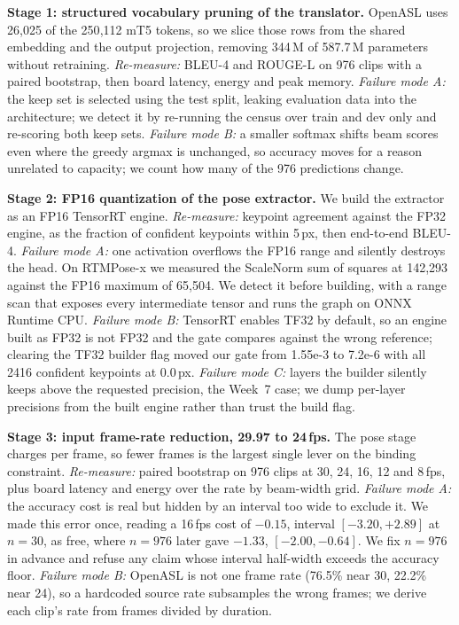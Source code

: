 \documentclass[conference]{IEEEtran}
\begin{document}
\textbf{Stage 1: structured vocabulary pruning of the translator.} OpenASL uses 26{,}025
of the 250{,}112 mT5 tokens, so we slice those rows from the shared embedding and the
output projection, removing 344\,M of 587.7\,M parameters without retraining.
\emph{Re-measure:} BLEU-4 and ROUGE-L on 976 clips with a paired bootstrap, then board
latency, energy and peak memory. \emph{Failure mode A:} the keep set is selected using
the test split, leaking evaluation data into the architecture; we detect it by
re-running the census over train and dev only and re-scoring both keep sets.
\emph{Failure mode B:} a smaller softmax shifts beam scores even where the greedy
argmax is unchanged, so accuracy moves for a reason unrelated to capacity; we count
how many of the 976 predictions change.

\textbf{Stage 2: FP16 quantization of the pose extractor.} We build the extractor as an
FP16 TensorRT engine. \emph{Re-measure:} keypoint agreement against the FP32 engine,
as the fraction of confident keypoints within 5\,px, then end-to-end BLEU-4.
\emph{Failure mode A:} one activation overflows the FP16 range and silently destroys
the head. On RTMPose-x we measured the
ScaleNorm sum of squares at 142{,}293 against the FP16 maximum of 65{,}504. We detect
it before building, with a range scan that exposes every intermediate tensor and runs
the graph on ONNX Runtime CPU. \emph{Failure mode B:} TensorRT enables TF32 by
default, so an engine built as FP32 is not FP32 and the gate compares against the
wrong reference; clearing the TF32 builder flag moved our gate from 1.55e-3 to 7.2e-6
with all 2416 confident keypoints at 0.0\,px. \emph{Failure mode C:} layers the
builder silently keeps above the requested precision, the Week~7 case; we dump
per-layer precisions from the built engine rather than trust the build flag.

\textbf{Stage 3: input frame-rate reduction, 29.97 to 24\,fps.} The pose stage charges
per frame, so fewer frames is the largest single lever on the binding constraint.
\emph{Re-measure:} paired bootstrap on 976 clips at 30, 24, 16, 12 and 8\,fps, plus
board latency and energy over the rate by beam-width grid. \emph{Failure mode A:} the
accuracy cost is real but hidden by an interval too wide to exclude it. We made this error once, reading a 16\,fps cost of $-0.15$,
interval $[-3.20, +2.89]$ at $n{=}30$, as free, where $n{=}976$ later gave $-1.33$,
$[-2.00, -0.64]$. We fix $n{=}976$ in advance and refuse any claim whose interval
half-width exceeds the accuracy floor. \emph{Failure mode B:} OpenASL is not one frame rate
(76.5\% near 30, 22.2\% near 24), so a hardcoded source rate subsamples the wrong
frames; we derive each clip's rate from frames divided by duration.
\end{document}
